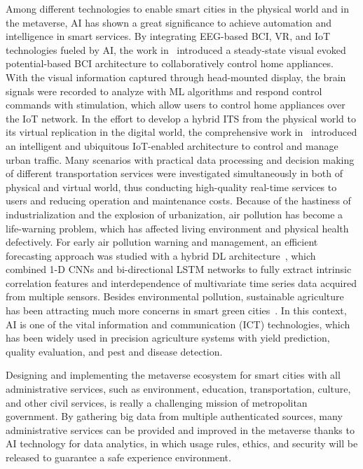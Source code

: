 \documentclass[journal]{IEEEtran}
\begin{document}
Among different technologies to enable smart cities in the physical world and in the metaverse, AI has shown a great significance to achieve automation and intelligence in smart services. By integrating EEG-based BCI, VR, and IoT technologies fueled by AI, the work in~\cite{park2019development} introduced a steady-state visual evoked potential-based BCI architecture to collaboratively control home appliances. With the visual information captured through head-mounted display, the brain signals were recorded to analyze with ML algorithms and respond control commands with stimulation, which allow users to control home appliances over the IoT network.
In the effort to develop a hybrid ITS from the physical world to its virtual replication in the digital world, the comprehensive work in~\cite{zhu2020parallel} introduced an intelligent and ubiquitous IoT-enabled architecture to control and manage urban traffic. Many scenarios with practical data processing and decision making of different transportation services were investigated simultaneously in both of physical and virtual world, thus conducting high-quality real-time services to users and reducing operation and maintenance costs.
Because of the hastiness of industrialization and the explosion of urbanization, air pollution has become a life-warning problem, which has affected living environment and physical health defectively. 
For early air pollution warning and management, an efficient forecasting approach was studied with a hybrid DL architecture~\cite{du2021deepair}, which combined 1-D CNNs and bi-directional LSTM networks to fully extract intrinsic correlation features and interdependence of multivariate time series data acquired from multiple sensors. 
Besides environmental pollution, sustainable agriculture has been attracting much more concerns in smart green cities~\cite{bhat2021bigdata}. In this context, AI is one of the vital information and communication (ICT) technologies, which has been widely used in precision agriculture systems with yield prediction, quality evaluation, and pest and disease detection. 

 Designing and implementing the metaverse ecosystem for smart cities with all administrative services, such as environment, education, transportation, culture, and other civil services, is really a challenging mission of metropolitan government. By gathering big data from multiple authenticated sources, many administrative services can be provided and improved in the metaverse thanks to AI technology for data analytics, in which usage rules, ethics, and security will be released to guarantee a safe experience environment.
\end{document}
